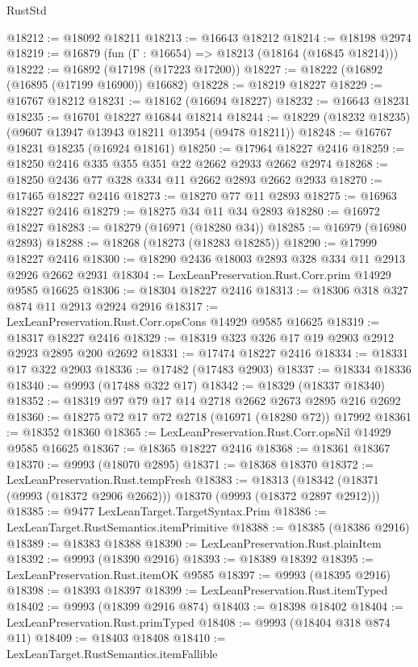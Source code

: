 \begin{lexlean}{RustStd}
\begin{coremodule}
@18212 := @18092 @18211
@18213 := @16643 @18212
@18214 := @18198 @2974
@18219 := @16879 (fun (Γ : @16654) => @18213 (@18164 (@16845 @18214)))
@18222 := @16892 (@17198 (@17223 @17200))
@18227 := @18222 (@16892 (@16895 (@17199 @16900)) @16682)
@18228 := @18219 @18227
@18229 := @16767 @18212
@18231 := @18162 (@16694 @18227)
@18232 := @16643 @18231
@18235 := @16701 @18227 @16844 @18214
@18244 := @18229 (@18232 @18235) (@9607 @13947 @13943 @18211 @13954 (@9478 @18211))
@18248 := @16767 @18231 @18235 (@16924 @18161)
@18250 := @17964 @18227 @2416
@18259 := @18250 @2416 @335 @355 @351 @22 @2662 @2933 @2662 @2974
@18268 := @18250 @2436 @77 @328 @334 @11 @2662 @2893 @2662 @2933
@18270 := @17465 @18227 @2416
@18273 := @18270 @77 @11 @2893
@18275 := @16963 @18227 @2416
@18279 := @18275 @34 @11 @34 @2893
@18280 := @16972 @18227
@18283 := @18279 (@16971 (@18280 @34))
@18285 := @16979 (@16980 @2893)
@18288 := @18268 (@18273 (@18283 @18285))
@18290 := @17999 @18227 @2416
@18300 := @18290 @2436 @18003 @2893 @328 @334 @11 @2913 @2926 @2662 @2931
@18304 := LexLeanPreservation.Rust.Corr.prim @14929 @9585 @16625
@18306 := @18304 @18227 @2416
@18313 := @18306 @318 @327 @874 @11 @2913 @2924 @2916
@18317 := LexLeanPreservation.Rust.Corr.opsCons @14929 @9585 @16625
@18319 := @18317 @18227 @2416
@18329 := @18319 @323 @326 @17 @19 @2903 @2912 @2923 @2895 @200 @2692
@18331 := @17474 @18227 @2416
@18334 := @18331 @17 @322 @2903
@18336 := @17482 (@17483 @2903)
@18337 := @18334 @18336
@18340 := @9993 (@17488 @322 @17)
@18342 := @18329 (@18337 @18340)
@18352 := @18319 @97 @79 @17 @14 @2718 @2662 @2673 @2895 @216 @2692
@18360 := @18275 @72 @17 @72 @2718 (@16971 (@18280 @72)) @17992
@18361 := @18352 @18360
@18365 := LexLeanPreservation.Rust.Corr.opsNil @14929 @9585 @16625
@18367 := @18365 @18227 @2416
@18368 := @18361 @18367
@18370 := @9993 (@18070 @2895)
@18371 := @18368 @18370
@18372 := LexLeanPreservation.Rust.tempFresh
@18383 := @18313 (@18342 (@18371 (@9993 (@18372 @2906 @2662))) @18370 (@9993 (@18372 @2897 @2912)))
@18385 := @9477 LexLeanTarget.TargetSyntax.Prim
@18386 := LexLeanTarget.RustSemantics.itemPrimitive
@18388 := @18385 (@18386 @2916)
@18389 := @18383 @18388
@18390 := LexLeanPreservation.Rust.plainItem
@18392 := @9993 (@18390 @2916)
@18393 := @18389 @18392
@18395 := LexLeanPreservation.Rust.itemOK @9585
@18397 := @9993 (@18395 @2916)
@18398 := @18393 @18397
@18399 := LexLeanPreservation.Rust.itemTyped
@18402 := @9993 (@18399 @2916 @874)
@18403 := @18398 @18402
@18404 := LexLeanPreservation.Rust.primTyped
@18408 := @9993 (@18404 @318 @874 @11)
@18409 := @18403 @18408
@18410 := LexLeanTarget.RustSemantics.itemFallible

\end{coremodule}
\end{lexlean}
